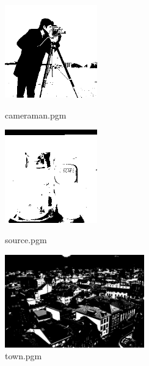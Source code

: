 \documentclass{jsarticle}
\begin{document}
\begin{figure}[htbp]
 \begin{minipage}{0.33\hsize}
  \begin{center}
   \includegraphics[height=40mm]{mode-cameraman.png}
  \end{center}
  \caption{cameraman.pgm}
  \label{fig:one}
 \end{minipage}
 \begin{minipage}{0.33\hsize}
  \begin{center}
   \includegraphics[height=40mm]{mode-source.png}
  \end{center}
  \caption{source.pgm}
  \label{fig:two}
 \end{minipage}
 \begin{minipage}{0.33\hsize}
  \begin{center}
   \includegraphics[height=40mm]{mode-town.png}
  \end{center}
  \caption{town.pgm}
  \label{fig:three}
 \end{minipage}
\end{figure}
\end{document}

